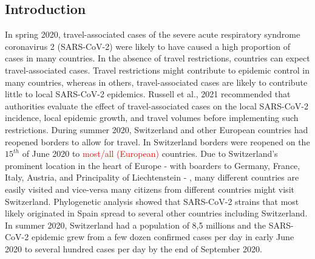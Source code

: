 \documentclass[10pt, a4paper, twoside]{article}
\begin{document}
\begin{multicols}{2}
\section{Introduction}
In spring 2020, travel-associated cases of the severe acute respiratory syndrome coronavirus 2 (SARS-CoV-2) were likely to have caused a high proportion of cases in many countries.\cite{russell_effect_2021} 
In the absence of travel restrictions, countries can expect travel-associated cases.\cite{russell_effect_2021} 
Travel restrictions might contribute to epidemic control in many countries, whereas in others, travel-associated cases are likely to contribute little to local SARS-CoV-2 epidemics.\cite{russell_effect_2021}  
Russell et al., 2021 recommended that authorities evaluate the effect of travel-associated cases on the local SARS-CoV-2 incidence, local epidemic growth, and travel volumes before implementing such restrictions.\cite{russell_effect_2021} 
During summer 2020, Switzerland and other European countries had reopened borders to allow for travel. 
In Switzerland borders were reopened on the $15^{th}$ of June 2020 to \textcolor{red}{most/all (European)} countries. 
Due to Switzerland's prominent location in the heart of Europe - with boarders to Germany, France, Italy, Austria, and Principality of Liechtenstein - , many different countries are easily visited and vice-versa many citizens from different countries might visit Switzerland. 
Phylogenetic analysis showed that SARS-CoV-2 strains that most likely originated in Spain spread to several other countries including Switzerland.\cite{hodcroft_emergence_2020}
In summer 2020, Switzerland had a population of 8,5 millions and the SARS-CoV-2 epidemic grew from a few dozen confirmed cases per day in early June 2020 to several hundred cases per day by the end of September 2020. 


\end{multicols}
\end{document}
